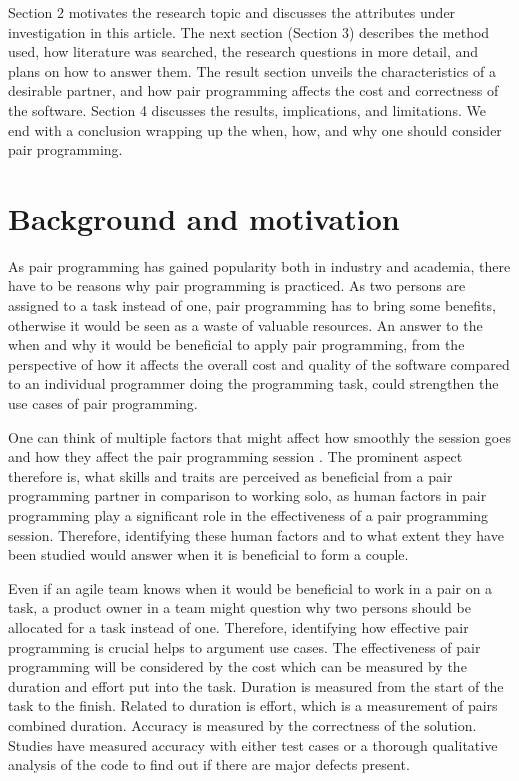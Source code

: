 \documentclass[conference]{IEEEtran}
\begin{document}
Section 2 motivates the research topic and discusses the attributes under investigation in this article. The next section (Section 3) describes the method used, how literature was searched, the research questions in more detail, and plans on how to answer them. The result section unveils the characteristics of a desirable partner, and how pair programming affects the cost and correctness of the software. Section 4 discusses the results, implications, and limitations. We end with a conclusion wrapping up the when, how, and why one should consider pair programming.

\section{Background and motivation}

As pair programming has gained popularity both in industry and academia, there have to be reasons why pair programming is practiced. As two persons are assigned to a task instead of one, pair programming has to bring some benefits, otherwise it would be seen as a waste of valuable resources. An answer to the when and why it would be beneficial to apply pair programming, from the perspective of how it affects the overall cost and quality of the software compared to an individual programmer doing the programming task, could strengthen the use cases of pair programming.

One can think of multiple factors that might affect how smoothly the session goes and how they affect the pair programming session \cite{10.1145/1414004.1414026}. The prominent aspect therefore is, what skills and traits are perceived as beneficial from a pair programming partner in comparison to working solo, as human factors in pair programming play a significant role in the effectiveness of a pair programming session. Therefore, identifying these human factors and to what extent they have been studied would answer when it is beneficial to form a couple.

Even if an agile team knows when it would be beneficial to work in a pair on a task, a product owner in a team might question why two persons should be allocated for a task instead of one. Therefore, identifying how effective pair programming is crucial helps to argument use cases. The effectiveness of pair programming will be considered by the cost which can be measured by the duration and effort put into the task. Duration is measured from the start of the task to the finish. Related to duration is effort, which is a measurement of pairs combined duration. Accuracy is measured by the correctness of the solution. Studies have measured accuracy with either test cases or a thorough qualitative analysis of the code to find out if there are major defects present. 
\end{document}
